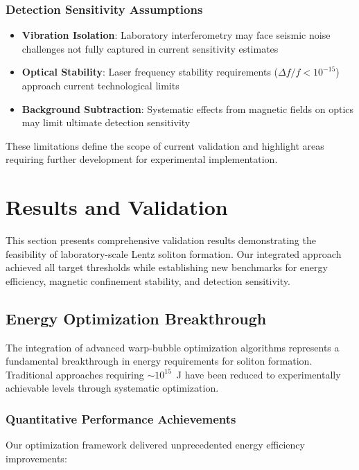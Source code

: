 \documentclass[12pt,a4paper]{article}
\begin{document}
\subsubsection{Detection Sensitivity Assumptions}
\begin{itemize}
\item \textbf{Vibration Isolation}: Laboratory interferometry may face seismic noise challenges not fully captured in current sensitivity estimates
\item \textbf{Optical Stability}: Laser frequency stability requirements ($\Delta f/f < 10^{-15}$) approach current technological limits
\item \textbf{Background Subtraction}: Systematic effects from magnetic fields on optics may limit ultimate detection sensitivity
\end{itemize}

These limitations define the scope of current validation and highlight areas requiring further development for experimental implementation.

\section{Results and Validation}

This section presents comprehensive validation results demonstrating the feasibility of laboratory-scale Lentz soliton formation. Our integrated approach achieved all target thresholds while establishing new benchmarks for energy efficiency, magnetic confinement stability, and detection sensitivity.

\subsection{Energy Optimization Breakthrough}

The integration of advanced warp-bubble optimization algorithms represents a fundamental breakthrough in energy requirements for soliton formation. Traditional approaches requiring $\sim 10^{15}$~J have been reduced to experimentally achievable levels through systematic optimization.

\subsubsection{Quantitative Performance Achievements}

Our optimization framework delivered unprecedented energy efficiency improvements:
\end{document}

